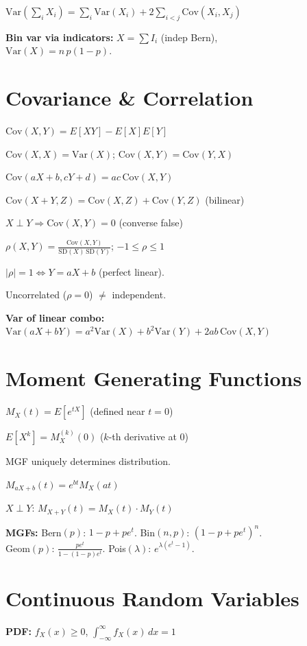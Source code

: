 \documentclass[6pt]{article}
\newcommand{\hi}[1]{\colorbox{yellow!25}{\ensuremath{#1}}}
\begin{document}
\begin{multicols}{4}
$\text{Var}(\sum_i X_i)=\sum_i\text{Var}(X_i)+2\sum_{i<j}\text{Cov}(X_i,X_j)$

\textbf{Bin var via indicators:} $X=\sum I_i$ (indep Bern),\\
$\text{Var}(X)=n\,p(1{-}p)$.

\section{Covariance \& Correlation}

\hi{\text{Cov}(X,Y)=E[XY]-E[X]E[Y]}

$\text{Cov}(X,X)=\text{Var}(X)$;\; $\text{Cov}(X,Y)=\text{Cov}(Y,X)$

$\text{Cov}(aX+b,cY+d)=ac\,\text{Cov}(X,Y)$

$\text{Cov}(X+Y,Z)=\text{Cov}(X,Z)+\text{Cov}(Y,Z)$ (bilinear)

$X\perp Y \Rightarrow \text{Cov}(X,Y)=0$ (converse false)

$\rho(X,Y)=\frac{\text{Cov}(X,Y)}{\text{SD}(X)\,\text{SD}(Y)}$;\; $-1\leq\rho\leq 1$

$|\rho|=1 \iff Y=aX+b$ (perfect linear).

Uncorrelated ($\rho=0$) $\neq$ independent.

\textbf{Var of linear combo:}\\
\hi{\text{Var}(aX+bY)=a^2\text{Var}(X)+b^2\text{Var}(Y)+2ab\,\text{Cov}(X,Y)}

\section{Moment Generating Functions}

$M_X(t)=E[e^{tX}]$ \;(defined near $t=0$)

$E[X^k]=M_X^{(k)}(0)$ ($k$-th derivative at 0)

MGF uniquely determines distribution.

$M_{aX+b}(t)=e^{bt}M_X(at)$

$X\perp Y$: $M_{X+Y}(t)=M_X(t)\cdot M_Y(t)$

\textbf{MGFs:} Bern$(p)$: $1-p+pe^t$. Bin$(n,p)$: $(1-p+pe^t)^n$.\\
Geom$(p)$: $\frac{pe^t}{1-(1-p)e^t}$. Pois$(\lambda)$: $e^{\lambda(e^t-1)}$.

\section{Continuous Random Variables}

\textbf{PDF:} $f_X(x)\geq 0$, $\int_{-\infty}^{\infty} f_X(x)\,dx=1$


\end{multicols}
\end{document}
